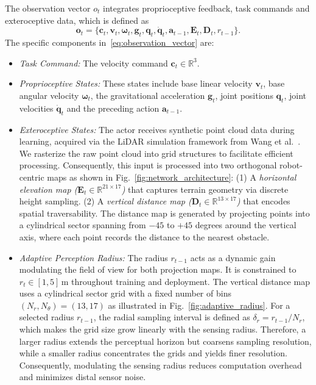 The observation vector $o_t$ integrates proprioceptive feedback, task commands and exteroceptive data, which is defined as
\begin{equation}
\mathbf{o}_t = \{
\mathbf{c}_t, 
\mathbf{v}_t, \boldsymbol{\omega}_t, \mathbf{g}_t, \mathbf{q}_t, \dot{\mathbf{q}}_t, \mathbf{a}_{t-1},
\mathbf{E}_t, \mathbf{D}_t, r_{t-1}
\}.
\label{eq:observation_vector}
\end{equation}
The specific components in~\eqref{eq:observation_vector} are:
\begin{itemize}
    \item \textit{Task Command:} The velocity command $\mathbf{c}_t \in \mathbb{R}^3$.
    \item \textit{Proprioceptive States:} These states include base linear velocity $\mathbf{v}_t$, base angular velocity $\boldsymbol{\omega}_t$, the gravitational acceleration $\mathbf{g}_t$, joint positions $\mathbf{q}_t$, joint velocities $\dot{\mathbf{q}}_t$ and the preceding action $\mathbf{a}_{t-1}$.
    \item \textit{Exteroceptive States:} The actor receives synthetic point cloud data during learning, acquired via the LiDAR simulation framework from Wang et al.~\cite{Wang_2025_Omni-Perception}. 
    We rasterize the raw point cloud into grid structures to facilitate efficient processing. Consequently, this input is processed into two orthogonal robot-centric maps as shown in Fig.~\ref{fig:network_architecture}:
    (1) A \textit{horizontal elevation map ($\mathbf{E}_t \in \mathbb{R}^{21 \times 17}$)} that captures terrain geometry via discrete height sampling.
    (2) A \textit{vertical distance map ($\mathbf{D}_t \in \mathbb{R}^{13 \times 17}$)} that encodes spatial traversability. The distance map is generated by projecting points into a cylindrical sector spanning from $-45$ to $+45$ degrees around the vertical axis, where each point records the distance to the nearest obstacle.
    \item \textit{Adaptive Perception Radius:} The radius $r_{t-1}$ acts as a dynamic gain modulating the field of view for both projection maps. It is constrained to $r_t \in [1, 5]$\,m throughout training and deployment. The vertical distance map uses a cylindrical sector grid with a fixed number of bins $(N_r, N_\theta) = (13, 17)$ as illustrated in Fig.~\ref{fig:adaptive_radius}. For a selected radius $r_{t-1}$, the radial sampling interval is defined as
    $\delta_r = {r_{t-1}}/{N_r}$,
    which makes the grid size grow linearly with the sensing radius. Therefore, a larger radius extends the perceptual horizon but coarsens sampling resolution, while a smaller radius concentrates the grids and yields finer resolution. Consequently, modulating the sensing radius reduces computation overhead and minimizes distal sensor noise. 
\end{itemize}
    
